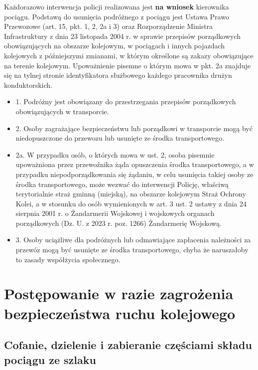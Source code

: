 Każdorazowo interwencja policji realizowana jest \textbf{na wniosek} kierownika pociągu. Podstawą do usunięcia podróżnego z pociągu jest Ustawa Prawo Przewozowe (art. 15, pkt. 1, 2, 2a i 3) oraz Rozporządzenie Ministra Infrastruktury z dnia 23 listopada 2004 r. w sprawie przepisów porządkowych obowiązujących na obszarze kolejowym, w pociągach i innych pojazdach kolejowych z późniejszymi zmianami, w którym określone są zakazy obowiązujące na terenie kolejowym. Upoważnienie pisemne o którym mowa w pkt. 2a znajduje się na tylnej stronie identyfikatora służbowego każdego pracownika drużyn konduktorskich.
\begin{tcolorbox}[colback=teal!5!white,colframe=red!45!black,width=0.45\textwidth,title=Art. 15. ustawy Prawo Przewozowe]
	
	\begin{itemize}
		\item 1. Podróżny jest obowiązany do przestrzegania przepisów porządkowych obowiązujących w transporcie.
		\item 2. Osoby zagrażające bezpieczeństwu lub porządkowi w transporcie mogą być
		niedopuszczone do przewozu lub usunięte ze środka transportowego.
		\item 2a. W przypadku osób, o których mowa w ust. 2, osoba pisemnie upoważniona przez przewoźnika żąda opuszczenia środka transportowego, a w przypadku niepodporządkowania się żądaniu, w celu usunięcia takiej osoby ze środka transportowego, może wezwać do interwencji Policję, właściwą terytorialnie straż gminną (miejską), na obszarze kolejowym Straż Ochrony Kolei, a w stosunku do osób wymienionych w art. 3 ust. 2 ustawy z dnia 24 sierpnia 2001 r. o Żandarmerii Wojskowej i wojskowych organach porządkowych (Dz. U. z 2023 r. poz. 1266) Żandarmerię Wojskową.
		\item 3. Osoby uciążliwe dla podróżnych lub odmawiające zapłacenia należności za przewóz mogą być usunięte ze środka transportowego, chyba że naruszałoby to zasady współżycia społecznego.
	\end{itemize}	
\end{tcolorbox}

\chapter{Postępowanie w razie zagrożenia bezpieczeństwa ruchu kolejowego}

\section{Cofanie, dzielenie i zabieranie częściami składu pociągu ze szlaku}

